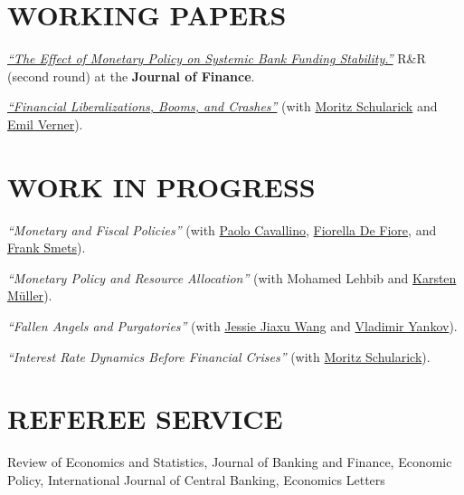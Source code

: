 \documentclass{res}
\begin{document}
\begin{resume}
\section{WORKING PAPERS}
\vspace{0.05in}
    \href{https://www.dropbox.com/scl/fi/7x0cuejrcm5okdf9a26bt/paper.pdf?rlkey=ygp1u26knhdp9qj2w7esnxvqn&e=1&dl=0}{\emph{``The Effect of Monetary Policy on Systemic Bank Funding Stability.''}}
    R\&R (second round) at the \textbf{Journal of Finance}.

    \href{https://www.federalreserve.gov/econres/feds/financial-liberalizations-booms-and-crashes.htm}{\emph{``Financial Liberalizations, Booms, and Crashes''}} (with \href{https://www.moritzschularick.com/}{Moritz Schularick} and \href{https://www.emilverner.com/}{Emil Verner}).

\section{WORK IN PROGRESS}
\vspace{0.05in}
    \emph{``Monetary and Fiscal Policies''} (with \href{https://sites.google.com/site/pcavallino/}{Paolo Cavallino}, \href{https://www.bis.org/author/fiorella-de-fiore}{Fiorella De Fiore}, and \href{https://www.bis.org/author/frank-smets}{Frank Smets}).

    \emph{``Monetary Policy and Resource Allocation''} (with Mohamed Lehbib and \href{https://www.karstenmueller.com/}{Karsten M\"uller}).

    \emph{``Fallen Angels and Purgatories''} (with \href{https://jiaxuwang.com/}{Jessie Jiaxu Wang} and \href{https://odalv.net/}{Vladimir Yankov}).

    \emph{``Interest Rate Dynamics Before Financial Crises''} (with \href{https://www.moritzschularick.com/}{Moritz Schularick}).

\section{REFEREE SERVICE}
\vspace{0.05in}
    Review of Economics and Statistics, Journal of Banking and Finance, Economic Policy, International Journal of Central Banking, Economics Letters


\end{resume}
\end{document}
